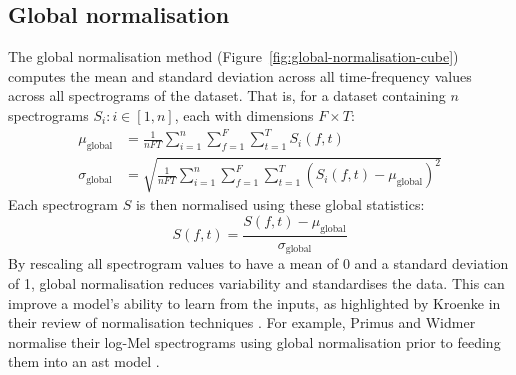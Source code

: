 \subsection{Global normalisation}
The global normalisation method (Figure~\ref{fig:global-normalisation-cube}) computes the mean and standard deviation across all time-frequency values across all spectrograms of the dataset. That is, for a dataset containing $n$ spectrograms $S_i : i \in [1, n]$, each with dimensions $F \times T$:
\begin{align}
    \mu_\text{global} &= \frac{1}{nFT} \sum_{i=1}^n \sum_{f=1}^F \sum_{t=1}^T S_i(f, t)\\
    \sigma_\text{global} &= \sqrt{\frac{1}{nFT} \sum_{i=1}^n \sum_{f=1}^F \sum_{t=1}^T \left(S_i(f, t) - \mu_\text{global}\right)^2}
\end{align} 
Each spectrogram $S$ is then normalised using these global statistics:
\begin{equation}
    S(f,t) = \frac{S(f,t) - \mu_{\text{global}}}{\sigma_{\text{global}}}
\end{equation}
By rescaling all spectrogram values to have a mean of 0 and a standard deviation of 1, global normalisation reduces variability and standardises the data. This can improve a model's ability to learn from the inputs, as highlighted by Kroenke in their review of normalisation techniques \cite{chris_kroenke_normalizing_2022}. For example, Primus and Widmer normalise their log-Mel spectrograms using global normalisation prior to feeding them into an \acrlong{ast} model \cite{primus_frequency-wise_2023}.

